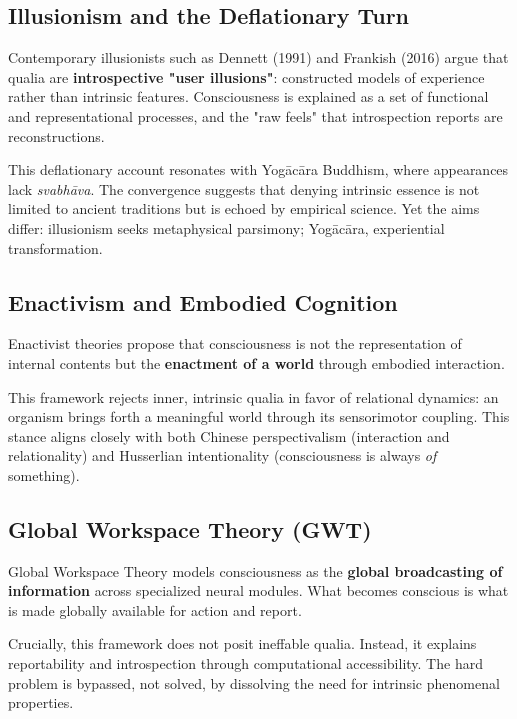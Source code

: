 \documentclass[11pt,a4paper]{article}
\begin{document}
\subsection{Illusionism and the Deflationary Turn}

Contemporary illusionists such as Dennett (1991) and Frankish (2016) argue that qualia are \textbf{introspective "user illusions"}: constructed models of experience rather than intrinsic features. Consciousness is explained as a set of functional and representational processes, and the "raw feels" that introspection reports are reconstructions.

This deflationary account resonates with Yogācāra Buddhism, where appearances lack \emph{svabhāva}. The convergence suggests that denying intrinsic essence is not limited to ancient traditions but is echoed by empirical science. Yet the aims differ: illusionism seeks metaphysical parsimony; Yogācāra, experiential transformation.

\subsection{Enactivism and Embodied Cognition}

Enactivist theories \cite{maturana1991, thompson2007} propose that consciousness is not the representation of internal contents but the \textbf{enactment of a world} through embodied interaction.

This framework rejects inner, intrinsic qualia in favor of relational dynamics: an organism brings forth a meaningful world through its sensorimotor coupling. This stance aligns closely with both Chinese perspectivalism (interaction and relationality) and Husserlian intentionality (consciousness is always \emph{of} something).

\subsection{Global Workspace Theory (GWT)}

Global Workspace Theory \cite{baars1997, dehaene2014} models consciousness as the \textbf{global broadcasting of information} across specialized neural modules. What becomes conscious is what is made globally available for action and report.

Crucially, this framework does not posit ineffable qualia. Instead, it explains reportability and introspection through computational accessibility. The hard problem is bypassed, not solved, by dissolving the need for intrinsic phenomenal properties.
\end{document}
